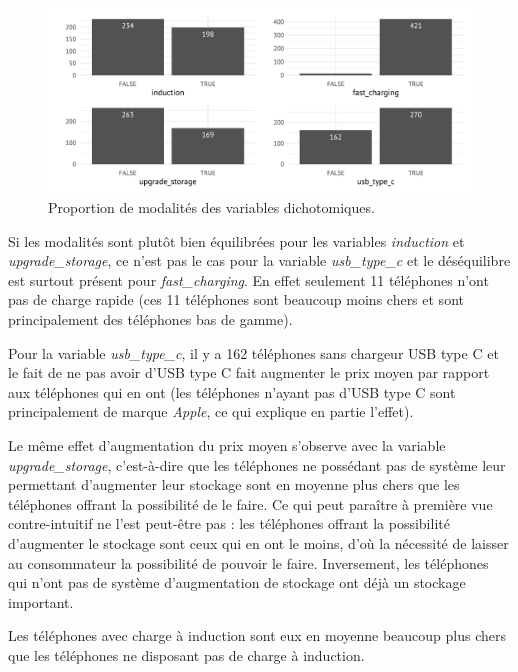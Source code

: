\documentclass[
  12pt,
]{report}
\begin{document}
\begin{figure}[H]

{\centering \includegraphics{report_files/figure-pdf/binary_vars-1.pdf}

}

\caption{Proportion de modalités des variables dichotomiques.}

\end{figure}%

Si les modalités sont plutôt bien équilibrées pour les variables
\emph{induction} et \emph{upgrade\_storage}, ce n'est pas le cas pour la
variable \emph{usb\_type\_c} et le déséquilibre est surtout présent pour
\emph{fast\_charging}. En effet seulement 11 téléphones n'ont pas de
charge rapide (ces 11 téléphones sont beaucoup moins chers et sont
principalement des téléphones bas de gamme).

Pour la variable \emph{usb\_type\_c}, il y a 162 téléphones sans
chargeur USB type C et le fait de ne pas avoir d'USB type C fait
augmenter le prix moyen par rapport aux téléphones qui en ont (les
téléphones n'ayant pas d'USB type C sont principalement de marque
\emph{Apple}, ce qui explique en partie l'effet).

Le même effet d'augmentation du prix moyen s'observe avec la variable
\emph{upgrade\_storage}, c'est-à-dire que les téléphones ne possédant
pas de système leur permettant d'augmenter leur stockage sont en moyenne
plus chers que les téléphones offrant la possibilité de le faire. Ce qui
peut paraître à première vue contre-intuitif ne l'est peut-être pas :
les téléphones offrant la possibilité d'augmenter le stockage sont ceux
qui en ont le moins, d'où la nécessité de laisser au consommateur la
possibilité de pouvoir le faire. Inversement, les téléphones qui n'ont
pas de système d'augmentation de stockage ont déjà un stockage
important.

Les téléphones avec charge à induction sont eux en moyenne beaucoup plus
chers que les téléphones ne disposant pas de charge à induction.
\end{document}
